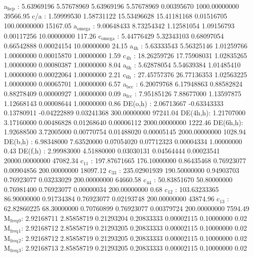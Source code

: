 \documentclass[11pt]{article}
\begin{document}
a\(_{\text{hcp}}\)   :   5.63969196   5.57678969   5.63969196   5.57678969   0.00395670 1000.00000000     39566.95
c/a     :   1.59999530   1.58731122  15.53496628  15.41181168   0.01516705 100.00000000     15167.05
a\(_{\text{omega}}\) :   9.00648433   8.73254342   1.12581054   1.09156793   0.00117256  10.00000000       117.26
c\(_{\text{omega}}\) :   5.44776429   5.32343103   0.68097054   0.66542888   0.00024154  10.00000000        24.15
a\(_{\text{4h}}\)    :   5.63333543   5.56325146   1.01259766   1.00000000   0.00015870   1.00000000         1.59
c\(_{\text{4h}}\)    :  18.26259726  17.75908031   1.02835265   1.00000000   0.00080387   1.00000000         8.04
a\(_{\text{6h}}\)    :   5.62878054   5.54639384   1.01485410   1.00000000   0.00022064   1.00000000         2.21
c\(_{\text{6h}}\)    :  27.45757376  26.77136353   1.02563225   1.00000000   0.00065701   1.00000000         6.57
a\(_{\text{bcc}}\)   :   6.20079768   6.17948863   0.88582824   0.88278409   0.00000927   1.00000000         0.09
a\(_{\text{fcc}}\)   :   7.95185126   7.88677000   1.13597875   1.12668143   0.00008644   1.00000000         0.86
DE(o,h) :   2.06713667  -0.63343333   0.13780911  -0.04222889   0.03241368 300.00000000     97241.04
DE(4h,h):   1.21707000   3.17160000   0.00486828   0.01268640   0.00006112 2000.00000000      1222.46
DE(6h,h):   1.92688500   3.72005000   0.00770754   0.01488020   0.00005145 2000.00000000      1028.94
DE(b,h) :   6.98348000   7.63520000   0.07054020   0.07712323   0.00004334   1.00000000         0.43
DE(f,h) :   2.99983000   4.51880000   0.03030131   0.04564444   0.00023541 20000.00000000     47082.34
c\(_{\text{11}}\)    : 197.87671665 176.10000000   0.86435468   0.76923077   0.00904856 200.00000000     18097.12
c\(_{\text{33}}\)    : 235.02901939 190.50000000   0.94903703   0.76923077   0.03233029 200.00000000     64660.58
c\(_{\text{44}}\)    :  50.83851670  50.80000000   0.76981400   0.76923077   0.00000034 200.00000000         0.68
c\(_{\text{12}}\)    : 103.63233365  86.90000000   0.91734384   0.76923077   0.02193748 200.00000000     43874.96
c\(_{\text{13}}\)    :  62.82860225  68.30000000   0.70760899   0.76923077   0.00379724 200.00000000      7594.49
M\(_{\text{freq}}\)\(_{\text{0}}\):   2.92168711   2.85858719   0.21293204   0.20833333   0.00002115   0.10000000         0.02
M\(_{\text{freq}}\)\(_{\text{1}}\):   2.92168712   2.85858719   0.21293205   0.20833333   0.00002115   0.10000000         0.02
M\(_{\text{freq}}\)\(_{\text{2}}\):   2.92168712   2.85858719   0.21293205   0.20833333   0.00002115   0.10000000         0.02
M\(_{\text{freq}}\)\(_{\text{3}}\):   2.92168713   2.85858719   0.21293205   0.20833333   0.00002115   0.10000000         0.02
\end{document}
